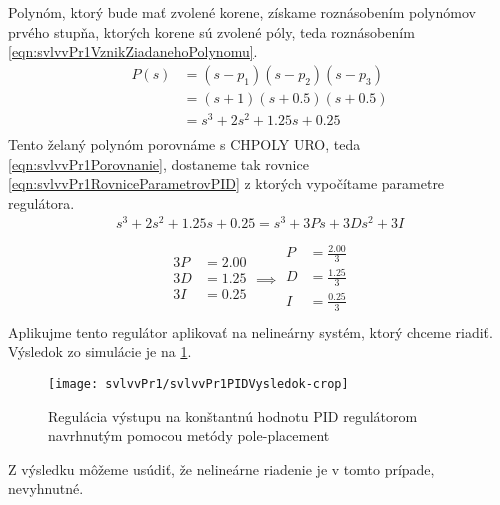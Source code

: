 \documentclass[../main.tex]{subfiles}
\begin{document}
	Polynóm, ktorý bude mať zvolené korene, získame roznásobením polynómov prvého stupňa, ktorých korene sú zvolené póly, teda roznásobením \cref{eqn:svlvvPr1VznikZiadanehoPolynomu}. 
		\begin{equation}
	\begin{aligned}
	P(s) &= (s - p_1)(s - p_2)(s - p_3) \\
		 &= (s + 1)(s + 0.5)(s + 0.5) \\
		 &= s^3 + 2s^2 + 1.25s + 0.25\\
	\end{aligned}
	\label{eqn:svlvvPr1VznikZiadanehoPolynomu}
	\end{equation}
	Tento želaný polynóm porovnáme s CHPOLY URO, teda \cref{eqn:svlvvPr1Porovnanie}, dostaneme tak rovnice \cref{eqn:svlvvPr1RovniceParametrovPID} z ktorých vypočítame parametre regulátora.
	\begin{equation}
	\begin{aligned}
		s^3 + 2s^2 + 1.25s + 0.25= s^3 + 3Ps + 3Ds^2 + 3I\\
	\end{aligned}
	\label{eqn:svlvvPr1Porovnanie}
	\end{equation}
	\begin{equation}
	\begin{aligned}
		\begin{matrix}
		3P &= 2.00 \\
		3D &= 1.25 \\ 
		3I &= 0.25 \\
		\end{matrix}
		\implies 
		\begin{matrix}
		P &= \frac{2.00}{3} \\
		D &= \frac{1.25}{3} \\ 
		I &= \frac{0.25}{3}  \\
		\end{matrix}
	\end{aligned}
	\label{eqn:svlvvPr1RovniceParametrovPID}
	\end{equation}
	Aplikujme tento regulátor aplikovať na nelineárny systém, ktorý chceme riadiť. Výsledok zo simulácie je na \cref{fig:svlvPr1VysledokPID}.
		\begin{figure}[h!]
			\centering
		\texttt{[image: svlvvPr1/svlvvPr1PIDVysledok-crop]}
		\caption{Regulácia výstupu na konštantnú hodnotu PID regulátorom navrhnutým pomocou metódy pole-placement}
		\label{fig:svlvPr1VysledokPID}
	\end{figure}
	Z výsledku môžeme usúdiť, že nelineárne riadenie je v tomto prípade, nevyhnutné.
	
\end{document}
